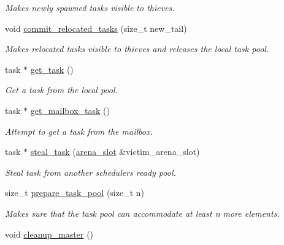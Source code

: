\begin{DoxyCompactItemize}
\begin{DoxyCompactList}\small\item\em Makes newly spawned tasks visible to thieves. \end{DoxyCompactList}\item 
void \hyperlink{classtbb_1_1internal_1_1generic__scheduler_aecf34e6a9902af76bbbeab1fd3851df8}{commit\+\_\+relocated\+\_\+tasks} (size\+\_\+t new\+\_\+tail)
\begin{DoxyCompactList}\small\item\em Makes relocated tasks visible to thieves and releases the local task pool. \end{DoxyCompactList}\item 
task $\ast$ \hyperlink{classtbb_1_1internal_1_1generic__scheduler_aded85ba71063b16621ee006bdc32404a}{get\+\_\+task} ()
\begin{DoxyCompactList}\small\item\em Get a task from the local pool. \end{DoxyCompactList}\item 
task $\ast$ \hyperlink{classtbb_1_1internal_1_1generic__scheduler_a3f3459e061761c342966531ea291f1c3}{get\+\_\+mailbox\+\_\+task} ()
\begin{DoxyCompactList}\small\item\em Attempt to get a task from the mailbox. \end{DoxyCompactList}\item 
\hypertarget{classtbb_1_1internal_1_1generic__scheduler_ab220458d93ee750e02a045c20ce5483d}{}task $\ast$ \hyperlink{classtbb_1_1internal_1_1generic__scheduler_ab220458d93ee750e02a045c20ce5483d}{steal\+\_\+task} (\hyperlink{structtbb_1_1internal_1_1arena__slot}{arena\+\_\+slot} \&victim\+\_\+arena\+\_\+slot)\label{classtbb_1_1internal_1_1generic__scheduler_ab220458d93ee750e02a045c20ce5483d}

\begin{DoxyCompactList}\small\item\em Steal task from another scheduler\textquotesingle{}s ready pool. \end{DoxyCompactList}\item 
size\+\_\+t \hyperlink{classtbb_1_1internal_1_1generic__scheduler_a0460616fb84af745b12688927ff1bb7d}{prepare\+\_\+task\+\_\+pool} (size\+\_\+t n)
\begin{DoxyCompactList}\small\item\em Makes sure that the task pool can accommodate at least n more elements. \end{DoxyCompactList}\item 
\hypertarget{classtbb_1_1internal_1_1generic__scheduler_a4fce89a2413f0f02e05c048a0a148081}{}void \hyperlink{classtbb_1_1internal_1_1generic__scheduler_a4fce89a2413f0f02e05c048a0a148081}{cleanup\+\_\+master} ()\label{classtbb_1_1internal_1_1generic__scheduler_a4fce89a2413f0f02e05c048a0a148081}


\end{DoxyCompactItemize}
